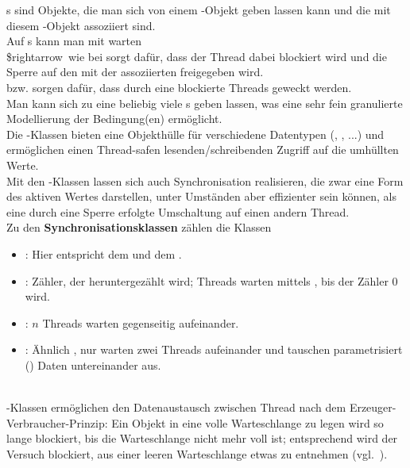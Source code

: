 \noindent
{}s sind Objekte, die man sich von einem -Objekt geben lassen kann und die mit diesem -Objekt assoziiert sind.\\
Auf s kann man mit  warten\\
\$rightarrow\ wie bei  sorgt  dafür, dass der Thread dabei blockiert wird und die Sperre auf den mit der  assoziierten  freigegeben wird.\\
 bzw.  sorgen dafür, dass durch eine  blockierte Threads geweckt werden.\\

\noindent
Man kann sich zu eine  beliebig viele s geben lassen, was eine sehr fein granulierte Modellierung der Bedingung(en) ermöglicht.\\

\noindent
Die -Klassen bieten eine Objekthülle für verschiedene Datentypen (, , ...) und ermöglichen einen Thread-safen lesenden/schreibenden Zugriff auf die umhüllten Werte.\\

\noindent
Mit den -Klassen lassen sich auch  Synchronisation realisieren, die zwar eine Form des aktiven Wertes darstellen, unter Umständen aber effizienter sein können, als eine durch eine Sperre erfolgte Umschaltung auf einen andern Thread.\\

\noindent
Zu den \textbf{Synchronisationsklassen} zählen die Klassen
\begin{itemize}
    \item {}: Hier entspricht  dem  und  dem .
    \item {}: Zähler, der heruntergezählt wird; Threads warten mittels , bis der Zähler $0$ wird.
    \item {}: $n$ Threads warten gegenseitig aufeinander.
    \item {}: Ähnlich , nur warten zwei Threads aufeinander und tauschen parametrisiert () Daten untereinander aus.
\end{itemize}\\

\noindent
{}-Klassen ermöglichen den  Datenaustausch zwischen Thread nach dem Erzeuger-Verbraucher-Prinzip: Ein Objekt in eine volle Warteschlange zu legen wird so lange blockiert, bis die Warteschlange nicht mehr voll ist; entsprechend wird der Versuch blockiert, aus einer leeren Warteschlange etwas zu entnehmen (vgl.~\cite[164]{Oec22}).

